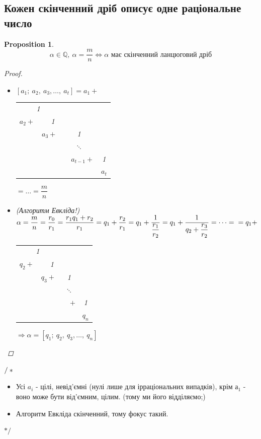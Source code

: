 \documentclass[a4paper,12pt, centered]{bookest}
\newtheorem*{prop*}{Proposition}
\begin{document}
\begin{appendices}
\section{Кожен скінченний дріб описує одне раціональне число}
\begin{prop*} $$\alpha\in\mathbb{Q},\>\alpha=\dfrac mn \Leftrightarrow\alpha \textrm{ має скінченний ланцюговий дріб}$$ 
	\begin{proof}$ $
		\begin{itemize}
			\item [$\Leftarrow$] $[a_1;\>a_2,\>a_3,\dots,\>a_t]=a_1+$
\begin{tabular}{ccccc}
\multicolumn{2}{c}{1}      &            &                 &       \\ \cline{1-2}
$a_2+$    & \multicolumn{2}{c}{1}       &                 &       \\ \cline{2-3}
          & $a_3+$         & \multicolumn{2}{c}{1}        &       \\ \cline{3-4}
          &                & \multicolumn{2}{c}{$\ddots$} &       \\
          &                &            & $a_{t-1}+$      & 1     \\ \cline{5-5} 
          &                &            &                 & $a_t$
\end{tabular} $=\dots=\dfrac mn$
			\item [$\Rightarrow$] (Алгоритм Евкліда!) $\\\alpha=\dfrac mn =\dfrac{r_0}{r_1}=\dfrac{r_1q_1+r_2}{r_1}=q_1+\dfrac{r_2}{r_1}=q_1+\dfrac1{\dfrac{r_1}{r_2}}=q_1+\dfrac1{q_2+\dfrac{r_3}{r_2}}=\dots=\\=q_1+$\begin{tabular}{ccccc}
\multicolumn{2}{c}{1}      &            &                 &       \\ \cline{1-2}
$q_2+$    & \multicolumn{2}{c}{1}       &                 &       \\ \cline{2-3}
          & $q_3+$         & \multicolumn{2}{c}{1}        &       \\ \cline{3-4}
          &                & \multicolumn{2}{c}{$\ddots$} &       \\
          &                &            & $+$      & 1     \\ \cline{5-5} 
          &                &            &                 & $q_n$
\end{tabular} $\Rightarrow\alpha=[q_1;\>q_2,\>q_3,\dots,\>q_n]$
		\end{itemize}
	\end{proof}
\end{prop*}
$\slash*\\$\begin{itemize}
	\item [$\Leftarrow$]Усі $a_i$ - цілі, невід'ємні (нулі лише для ірраціональних випадків), крім $а_1$ - воно може бути від'ємним, цілим. (тому ми його відділяємо;) 
	\item [$\Rightarrow$] Алгоритм Евкліда скінченний, тому фокус такий.
\end{itemize}
\begin{flushright}
$*\slash$
\end{flushright}

\end{appendices}
\end{document}
